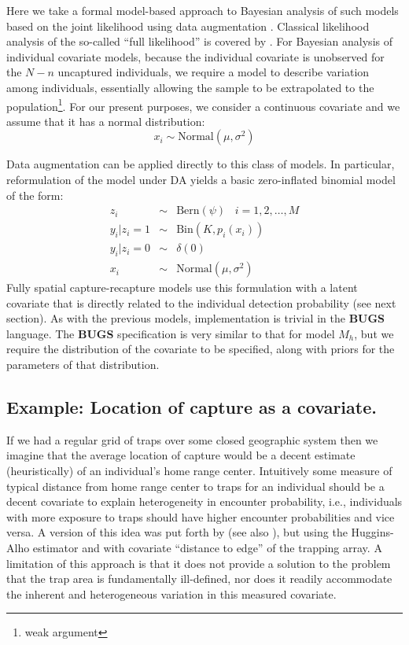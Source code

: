 Here we take a formal model-based approach to Bayesian analysis of
such models based on the joint likelihood
using data augmentation \citep{royle:2009}. Classical
likelihood analysis of the so-called ``full likelihood'' is covered 
 by \citet{borchers_etal:2002}.  For Bayesian analysis of
individual covariate models, because the individual covariate is
unobserved for the $N-n$ uncaptured individuals, we require a model to
describe variation among individuals, essentially allowing the sample
to be extrapolated to the population\footnote{weak argument}.  For our present purposes, we
consider a continuous covariate and we assume that it has a normal
distribution:
\[
x_{i} \sim \mbox{Normal}(\mu,\sigma^{2})
\]

Data augmentation can be applied directly to this class of models. In
particular, reformulation of the model under DA yields a basic
zero-inflated binomial model of the form:
\begin{eqnarray*}
z_{i} &\sim& \mbox{Bern}(\psi) \; \; \; i=1,2,\ldots,M\\
y_{i}|{z_{i}\! =\! 1} &\sim& \mbox{Bin}(K,p_{i}(x_{i})) \\
y_{i} |{ z_{i}\! =\! 0} &\sim& \delta(0)  \\
x_{i} & \sim & \mbox{Normal}(\mu,\sigma^{2})
\end{eqnarray*}
Fully spatial capture-recapture models use this
formulation with a latent covariate that is directly related to the
individual detection probability (see next section). As with the
previous models, implementation is trivial in the {\bf BUGS} language. The
{\bf BUGS} specification is very similar to that for model $M_h$, but we
require the distribution of the covariate to be specified, along with
priors for the parameters of that distribution.


\subsection{Example: Location of capture as a covariate.}

If we had a regular grid of traps over some closed geographic system
then we imagine that the average location of capture would be a decent
estimate (heuristically) of an individual's home range center.
Intuitively some measure of typical distance from home range center to
traps for an individual should be a decent covariate to explain
heterogeneity in encounter probability, i.e., individuals with more
exposure to traps should have higher encounter probabilities and vice
versa.  A version of this idea was put forth by
\citet{boulanger_mclellan:2001} (see also \citet{ivan:2012}), but
using the Huggins-Alho estimator and with covariate ``distance to
edge'' of the trapping array. A limitation of this  approach is
that it does not provide a solution to the problem that the trap area
is fundamentally ill-defined, nor does it readily accommodate the
inherent and heterogeneous variation in this measured covariate.

